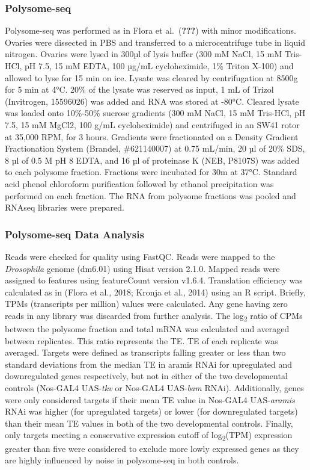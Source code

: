 \documentclass[12pt,oneside]{reedthesis}
\begin{document}
\hypertarget{polysome-seq}{%
\subsubsection{Polysome-seq}\label{polysome-seq}}

Polysome-seq was performed as in Flora et al.~({\textbf{???}}) with minor modifications. Ovaries were dissected in PBS and transferred to a microcentrifuge tube in liquid nitrogen. Ovaries were lysed in 300µl of lysis buffer (300 mM NaCl, 15 mM Tris-HCl, pH 7.5, 15 mM EDTA, 100 µg/mL cycloheximide, 1\% Triton X-100) and allowed to lyse for 15 min on ice. Lysate was cleared by centrifugation at 8500g for 5 min at 4°C. 20\% of the lysate was reserved as input, 1 mL of Trizol (Invitrogen, 15596026) was added and RNA was stored at -80°C. Cleared lysate was loaded onto 10\%-50\% sucrose gradients (300 mM NaCl, 15 mM Tris-HCl, pH 7.5, 15 mM MgCl2, 100 g/mL cycloheximide) and centrifuged in an SW41 rotor at 35,000 RPM, for 3 hours. Gradients were fractionated on a Density Gradient Fractionation System (Brandel, \#621140007) at 0.75 mL/min, 20 µl of 20\% SDS, 8 µl of 0.5 M pH 8 EDTA, and 16 µl of proteinase K (NEB, P8107S) was added to each polysome fraction. Fractions were incubated for 30m at 37°C. Standard acid phenol chloroform purification followed by ethanol precipitation was performed on each fraction. The RNA from polysome fractions was pooled and RNAseq libraries were prepared.

\hypertarget{polysome-seq-data-analysis}{%
\subsubsection{Polysome-seq Data Analysis}\label{polysome-seq-data-analysis}}

Reads were checked for quality using FastQC. Reads were mapped to the \emph{Drosophila} genome (dm6.01) using Hisat version 2.1.0. Mapped reads were assigned to features using featureCount version v1.6.4. Translation efficiency was calculated as in (Flora et al., 2018; Kronja et al., 2014) using an R script. Briefly, TPMs (transcripts per million) values were calculated. Any gene having zero reads in any library was discarded from further analysis. The log\textsubscript{2} ratio of CPMs between the polysome fraction and total mRNA was calculated and averaged between replicates. This ratio represents the TE. TE of each replicate was averaged. Targets were defined as transcripts falling greater or less than two standard deviations from the median TE in aramis RNAi for upregulated and downregulated genes respectively, but not in either of the two developmental controls (Nos-GAL4 UAS-\emph{tkv} or Nos-GAL4 UAS-\emph{bam} RNAi). Additionally, genes were only considered targets if their mean TE value in Nos-GAL4 UAS-\emph{aramis} RNAi was higher (for upregulated targets) or lower (for downregulated targets) than their mean TE values in both of the two developmental controls. Finally, only targets meeting a conservative expression cutoff of log\textsubscript{2}(TPM) expression greater than five were considered to exclude more lowly expressed genes as they are highly influenced by noise in polysome-seq in both controls.
\end{document}
